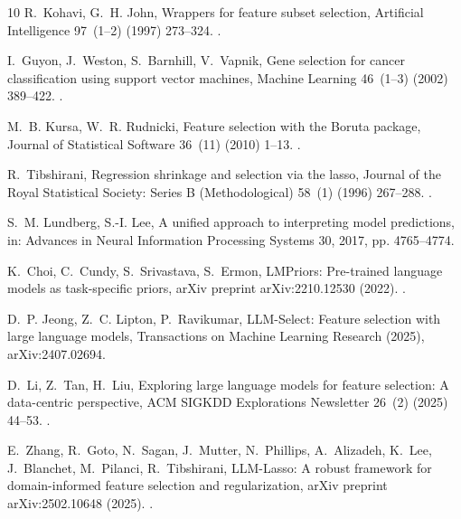 \documentclass[final,5p,twocolumn]{elsarticle}
\begin{document}
\begin{thebibliography}{10}
R.~Kohavi, G.~H. John, Wrappers for feature subset selection, Artificial
  Intelligence 97~(1--2) (1997) 273--324.
\newblock \href {https://doi.org/10.1016/S0004-3702(97)00043-X}
  {}.

I.~Guyon, J.~Weston, S.~Barnhill, V.~Vapnik, Gene selection for cancer
  classification using support vector machines, Machine Learning 46~(1--3)
  (2002) 389--422.
\newblock \href {https://doi.org/10.1023/A:1012487302797}
  {}.

M.~B. Kursa, W.~R. Rudnicki, Feature selection with the {B}oruta package,
  Journal of Statistical Software 36~(11) (2010) 1--13.
\newblock \href {https://doi.org/10.18637/jss.v036.i11}
  {}.

R.~Tibshirani, Regression shrinkage and selection via the lasso, Journal of the
  Royal Statistical Society: Series B (Methodological) 58~(1) (1996) 267--288.
\newblock \href {https://doi.org/10.1111/j.2517-6161.1996.tb02080.x}
  {}.

S.~M. Lundberg, S.-I. Lee, A unified approach to interpreting model
  predictions, in: Advances in Neural Information Processing Systems 30, 2017,
  pp. 4765--4774.

K.~Choi, C.~Cundy, S.~Srivastava, S.~Ermon, {LMPriors}: Pre-trained language
  models as task-specific priors, arXiv preprint arXiv:2210.12530 (2022).
\newblock \href {https://doi.org/10.48550/arXiv.2210.12530}
  {}.

D.~P. Jeong, Z.~C. Lipton, P.~Ravikumar, {LLM-Select}: Feature selection with
  large language models, Transactions on Machine Learning Research (2025),
  arXiv:2407.02694.

D.~Li, Z.~Tan, H.~Liu, Exploring large language models for feature selection: A
  data-centric perspective, ACM SIGKDD Explorations Newsletter 26~(2) (2025)
  44--53.
\newblock \href {https://doi.org/10.1145/3715073.3715077}
  {}.

E.~Zhang, R.~Goto, N.~Sagan, J.~Mutter, N.~Phillips, A.~Alizadeh, K.~Lee,
  J.~Blanchet, M.~Pilanci, R.~Tibshirani, {LLM-Lasso}: A robust framework for
  domain-informed feature selection and regularization, arXiv preprint
  arXiv:2502.10648 (2025).
\newblock \href {https://doi.org/10.48550/arXiv.2502.10648}
  {}.


\end{thebibliography}
\end{document}
